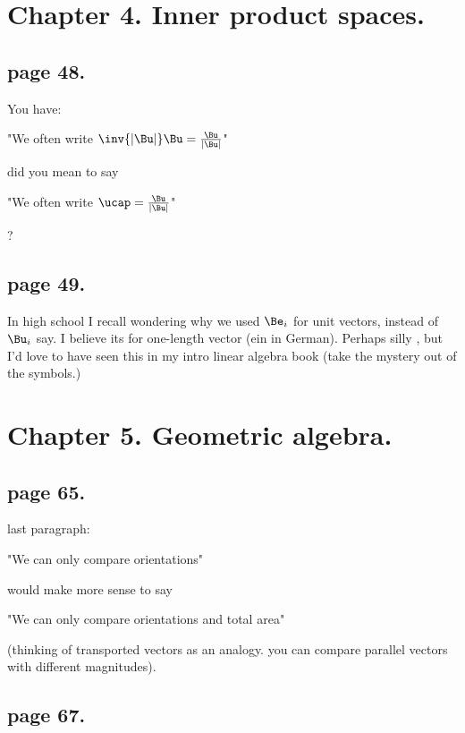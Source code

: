 \documentclass{article}
\author{Peeter Joot \quad peeter.joot@gmail.com}
\begin{document}

\section{ Chapter 4. Inner product spaces. }

\subsection{ page 48. }  

You have:

"We often write $\inv{\Abs{\Bu}}\Bu = \frac{\Bu}{\Abs{\Bu}}$"

did you mean to say

"We often write $\ucap = \frac{\Bu}{\Abs{\Bu}}$"

?

\subsection{ page 49. }

In high school I recall wondering why we used $\Be_i$ for unit vectors, instead of $\Bu_i$ say.
I 
believe its for one-length vector (ein in German).  Perhaps silly
, but I'd love to have seen this in my intro linear algebra book (take the mystery out of the symbols.)

\section{ Chapter 5.  Geometric algebra. } 

\subsection{ page 65. }

last paragraph:

  "We can only compare orientations"

would make more sense to say

  "We can only compare orientations and total area"

(thinking of transported vectors as an analogy.  you can compare parallel vectors with different magnitudes).

\subsection{ page 67. }
\end{document}
